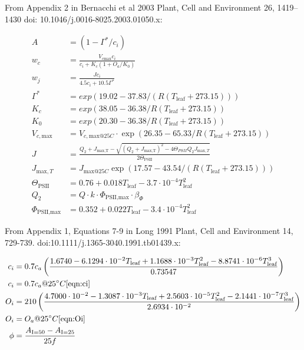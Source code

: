 \documentclass[10pt]{article}
\begin{document}
From Appendix 2 in Bernacchi et al 2003 Plant, Cell and Environment 26, 1419–1430  doi: 10.1046/j.0016-8025.2003.01050.x:

\begin{align}
A &= \left(1-\Gamma^\ast/c_i\right) \label{eqn:A}\\
w_c &= \frac{V_{c\text{max}}c_i}{c_i+K_c(1+O_a/K_0)}\label{eqn:wc}\\
w_j &= \frac{Jc_i}{4.5c_i + 10.5\Gamma^{*}}\label{eqn:wj}\\
\Gamma^\ast &= exp(19.02 - 37.83/(R(T_\text{leaf}+273.15)))\label{eqn:gammaast}\\
K_c &= exp(38.05-36.38/R(T_\text{leaf}+273.15))\label{eqn:Kc}\\
K_0&=exp(20.30-36.38/R(T_\text{leaf}+273.15))\label{eqn:K0}\\
V_{c,\text{max}}&=V_{c,\text{max}@25C}\cdot \exp(26.35-65.33/R(T_\text{leaf}+273.15))\label{eqn:Vcmax}\\
J&=\frac{Q_2+J_\text{max,T}-\sqrt{(Q_2+J_\text{max,T})^2-4\Theta_{PSII}Q_2J_{\text{max},T}}}{2\Theta_{\text{PSII}}}\label{eqn:J}\\
J_{\text{max},T}&=J_{\text{max}@25C}\exp(17.57-43.54/(R(T_\text{leaf}+273.15))) \label{eqn:Jmaxt}\\
\Theta_\text{PSII} &= 0.76+0.018T_\text{leaf}-3.7\cdot10^{-4}T_\text{leaf}^2\label{eqn:ThetaPSII}\\
Q_2&=Q\cdot k\cdot \Phi_\text{PSII,max}\cdot\beta_\Phi\label{eqn:Q2}\\
\Phi_\text{PSII,max}&= 0.352 + 0.022T_\text{leaf} - 3.4\cdot10^{-4} T_\text{leaf}^2\label{eqn:PhiPSIImax}
\end{align}

From Appendix 1, Equations 7-9 in Long 1991 Plant, Cell and Environment 14, 729-739. doi:10.1111/j.1365-3040.1991.tb01439.x:

\begin{align}
c_i &= 0.7c_a\left(\frac{1.6740-6.1294\cdot10^{-2}T_\text{leaf}+1.1688\cdot10^{-3}T_\text{leaf}^2-8.8741\cdot10^{-6}T_\text{leaf}^3}{0.73547}\right)\label{eqn:ci}\\
c_i&=0.7c_a @ 25^{\circ}C \ref{eqn:ci}\\
O_i&=210\left(\frac{4.7000\cdot10^{-2}-1.3087\cdot10^{-3}T_\text{leaf}+2.5603\cdot10^{-5}T_\text{leaf}^2-2.1441\cdot10^{-7}T_\text{leaf}^3}{2.6934\cdot10^{-2}}\right)\label{eqn:Oi}\\
O_i&=O_a  @ 25^{\circ}C\ref{eqn:Oi}\\
\phi&=\frac{A_{\text{I}=50}-A_{\text{I}=25}}{25f}\label{eqn:phi}
\end{align}
\end{document}
